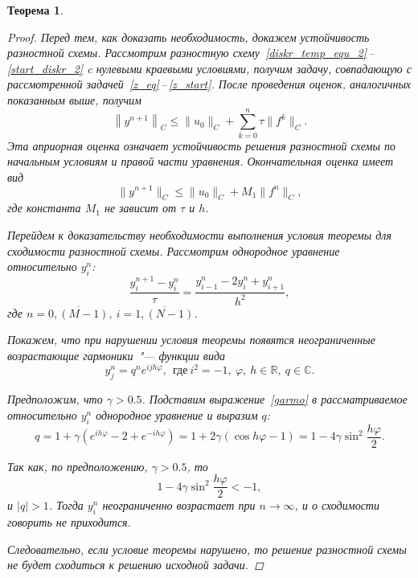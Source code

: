 \documentclass[11pt,a4paper,twoside,listtotoc,bibtotoc]{report}
\numberwithin{equation}{section}
\theoremstyle{definition}
\theoremstyle{plain}
\newtheorem*{theorem*}{Теорема}
\begin{document}
\begin{theorem*}
\begin{proof}
        Перед тем, как доказать необходимость, докажем устойчивость разностной
        схемы. Рассмотрим разностную схему~\eqref{diskr_temp_equ_2}\,--\,\eqref{start_diskr_2} c нулевыми краевыми условиями, получим задачу,
        совпадающую с рассмотренной задачей~\eqref{z_eq}\,--\,\eqref{z_start}.
        После проведения оценок, аналогичных показанным выше, получим
        $$
            \left\|y^{n+1}\right\|_C \leqslant \big\|u_0\big\|_C
            + \sum\limits_{k=0}^n \tau\big\|f^k\big\|_C.
        $$
        Эта априорная оценка означает устойчивость решения разностной схемы по
        начальным условиям и правой части уравнения. Окончательная оценка имеет вид
        $$
            \big\|y^{n+1}\big\|_C \leqslant \big\|u_0\big\|_C
            + M_1\big\|f^n\big\|_C,
        $$
        где константа $M_1$ не зависит от $\tau$ и $h$.

        Перейдем к доказательству необходимости выполнения условия теоремы для
        сходимости разностной схемы. Рассмотрим однородное уравнение
        относительно $y_i^n$:
        $$
            \dfrac{y_i^{n+1} - y_i^n}{\tau} = \dfrac{y^n_{i-1} - 2y_i^n + y_{i+1}^n}{h^2},
        $$
        где $n=\overline{0,(M-1)},~i=\overline{1,(N-1)}$.

        Покажем, что при нарушении условия теоремы появятся неограниченные
        возрастающие гармоники~"--- функции вида
        \begin{equation}
            \label{garmo}
            y_j^n = q^n e^{ijh\varphi},~~\text{где}~i^2 = -1,
            ~\varphi,~h \in \mathbb{R},~q \in \mathbb{C}.
        \end{equation}

        Предположим, что $\gamma > 0.5$.
        Подставим выражение~\eqref{garmo} в рассматриваемое относительно $y_i^n$
        однородное уравнение и выразим $q$:
        $$
            q = 1 + \gamma\left(e^{ih\varphi} - 2 + e^{-ih\varphi}\right) = 1 +
            2\gamma\left(\cos h\varphi - 1\right) = 1 -
            4\gamma\sin^2\dfrac{h\varphi}{2}.
        $$

        Так как, по предположению, $\gamma > 0.5$, то
        $$
            1 - 4 \gamma \sin^2\dfrac{h\varphi}{2} < -1,
        $$
        и $|q| > 1$. Тогда $y_i^n$ неограниченно возрастает при
        $n\rightarrow\infty$, и о сходимости говорить не приходится.

        Следовательно, если условие теоремы нарушено, то решение разностной
        схемы не будет сходиться к решению исходной задачи.
    \end{proof}
%
\end{theorem*}
\end{document}
